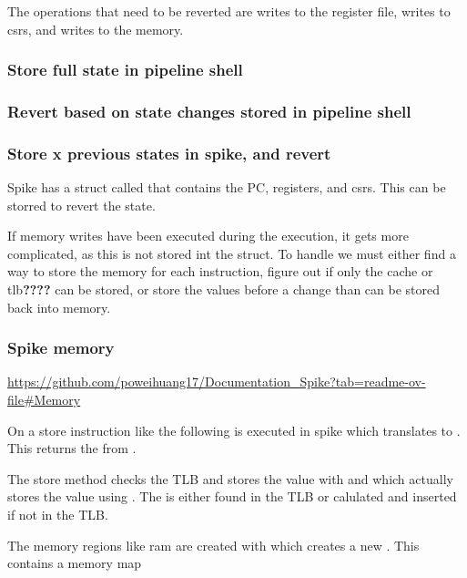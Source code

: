 The operations that need to be reverted are writes to the register file, writes to \acrshort{csr}s, and writes to the memory.

\subsubsection{Store full state in pipeline shell}

\subsubsection{Revert based on state changes stored in pipeline shell}

\subsubsection{Store x previous states in spike, and revert}

Spike has a struct called  that contains the PC, registers, and csrs. This can be storred to revert the state. 

If memory writes have been executed during the execution, it gets more complicated, as this is not stored int the  struct. To handle we must either find a way to store the memory for each instruction, figure out if only the cache or tlb\textbf{????} can be stored, or store the values before a change than can be stored back into memory.

\subsubsection{Spike memory}

\url{https://github.com/poweihuang17/Documentation_Spike?tab=readme-ov-file#Memory}

On a store instruction like  the following is executed in spike  which translates to . This returns the  from .

The store method checks the TLB and stores the value with  and  which actually stores the value using . The  is either found in the TLB or calulated and inserted if not in the TLB. 


The memory regions like ram are created with 
which creates a new . This contains a memory map 

